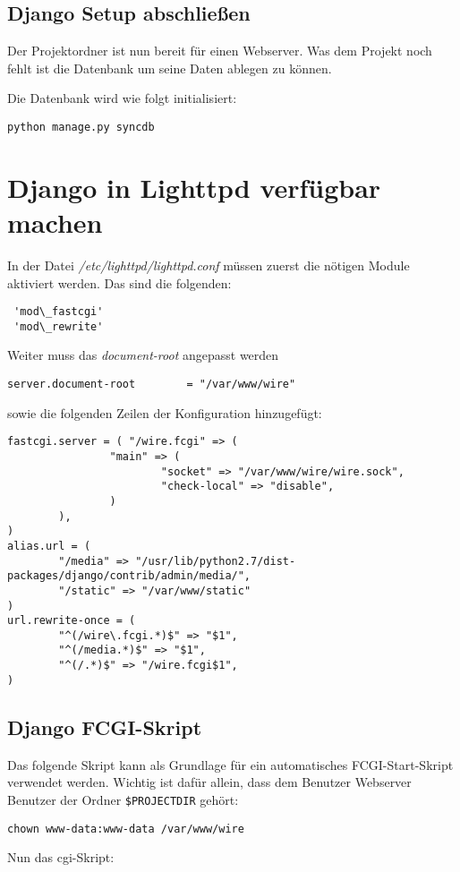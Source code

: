  \subsection{Django Setup abschließen}
 Der Projektordner ist nun bereit für einen Webserver. Was dem Projekt noch
 fehlt ist die Datenbank um seine Daten ablegen zu können.

 Die Datenbank wird wie folgt initialisiert:
\begin{lstlisting}
python manage.py syncdb
\end{lstlisting}

\section{Django in Lighttpd verfügbar machen}
In der Datei \emph{/etc/lighttpd/lighttpd.conf} müssen zuerst die nötigen
Module aktiviert werden. Das sind die folgenden:
\begin{lstlisting}
 'mod\_fastcgi'
 'mod\_rewrite'
\end{lstlisting}

Weiter muss das \emph{document-root} angepasst werden
\begin{lstlisting}
server.document-root        = "/var/www/wire"
\end{lstlisting}
sowie die folgenden Zeilen der Konfiguration hinzugefügt:
\begin{lstlisting}
fastcgi.server = ( "/wire.fcgi" => (
                "main" => (
                        "socket" => "/var/www/wire/wire.sock",
                        "check-local" => "disable",
                )
        ),
)
alias.url = (
        "/media" => "/usr/lib/python2.7/dist-packages/django/contrib/admin/media/",
        "/static" => "/var/www/static"
)
url.rewrite-once = (
        "^(/wire\.fcgi.*)$" => "$1",
        "^(/media.*)$" => "$1",
        "^(/.*)$" => "/wire.fcgi$1",
)
\end{lstlisting}

 \subsection{Django FCGI-Skript}
Das folgende Skript kann als Grundlage für ein automatisches FCGI-Start-Skript
verwendet werden. Wichtig ist dafür allein, dass dem Benutzer Webserver
Benutzer der Ordner
\lstinline{$PROJECTDIR} gehört:
\begin{lstlisting}
chown www-data:www-data /var/www/wire
\end{lstlisting}

Nun das \Gls{cgi}-Skript:

